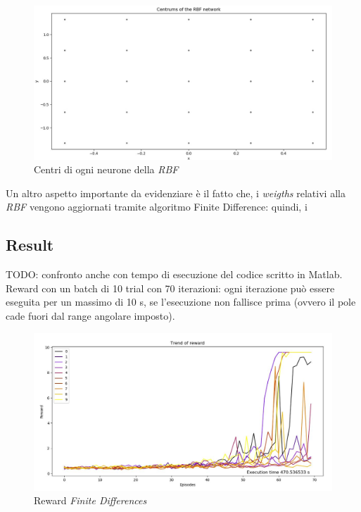 \begin{figure}[!h]
	\centering
	\includegraphics[width=\textwidth]{Immagini/Centrum_of_RBF.JPG}
	\caption{Centri di ogni neurone della \textit{RBF}}
	\label{fig:RBF_Centrum}
\end{figure}

Un altro aspetto importante da evidenziare è il fatto che, i \textit{weigths} relativi alla \textit{RBF} vengono aggiornati tramite algoritmo Finite Difference: quindi, i

\subsection{Result}
TODO: confronto anche con tempo di esecuzione del codice scritto in Matlab.
Reward con un batch di 10 trial con 70 iterazioni: ogni iterazione può essere eseguita per un massimo di 10 s, se l'esecuzione non fallisce prima (ovvero il pole cade fuori dal range angolare imposto).
\begin{figure}[!h]
	\centering
	\includegraphics[width=\textwidth]{Immagini/Reward_FD.JPG}
	\caption{Reward \textit{Finite Differences}}
	\label{fig:Reward_FD}
\end{figure}

\newpage